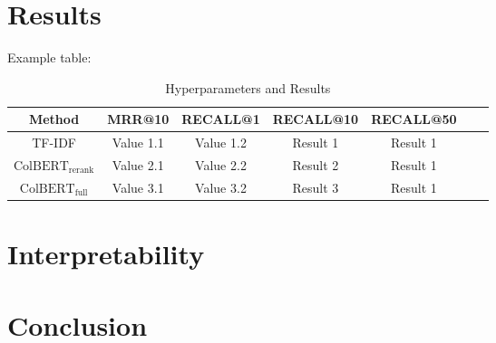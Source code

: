 \documentclass{article}
\begin{document}
\section{Results}


Example table:
\begin{table}[htbp]
    \centering
    \label{tab:hyperparameters}
    \begin{tabular}{ccccccc}
      \toprule
      \textbf{Method} & \textbf{MRR@10}  & \textbf{RECALL@1} & \textbf{RECALL@10} & \textbf{RECALL@50} \\
      \midrule
      TF-IDF & Value 1.1 & Value 1.2 & Result 1  & Result 1 \\
      $\text{ColBERT}_\text{rerank}$ & Value 2.1 & Value 2.2 & Result 2 & Result 1 \\
      $\text{ColBERT}_\text{full}$ & Value 3.1 & Value 3.2 & Result 3 & Result 1 \\
      \bottomrule
    \end{tabular}
    \caption{Hyperparameters and Results}
\end{table}

\section{Interpretability}

\section{Conclusion}

% 
% 
\end{document}
